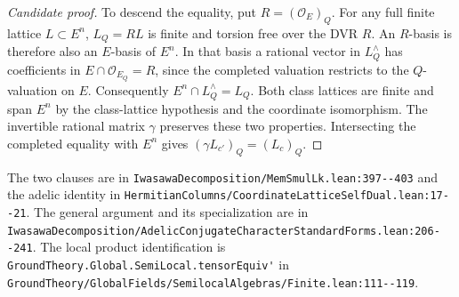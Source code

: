 \begin{proof}[Candidate proof]
To descend the equality, put $R=(\mathcal O_E)_Q$. For any full finite
lattice $L\subset E^n$, $L_Q=R L$ is finite and torsion free over the
DVR $R$. An $R$-basis is therefore also an $E$-basis of $E^n$.
In that basis a rational vector in $L_Q^\wedge$ has coefficients in
$E\cap \mathcal O_{E_Q}=R$, since the completed valuation restricts to
the $Q$-valuation on $E$. Consequently $E^n\cap L_Q^\wedge=L_Q$.
Both class lattices are finite and span $E^n$ by the class-lattice
hypothesis and the coordinate isomorphism. The invertible rational
matrix $\gamma$ preserves these two properties. Intersecting the
completed equality with $E^n$ gives $(\gamma L_{c'})_Q=(L_c)_Q$.
\end{proof}

\noindent\small The two clauses are in
\nolinkurl{IwasawaDecomposition/MemSmulLk.lean:397--403} and the adelic
identity in \nolinkurl{HermitianColumns/CoordinateLatticeSelfDual.lean:17--21}.
The general argument and its specialization  are in
\nolinkurl{IwasawaDecomposition/AdelicConjugateCharacterStandardForms.lean:206--241}.
The local product identification is \nolinkurl{GroundTheory.Global.SemiLocal.tensorEquiv'}
in \nolinkurl{GroundTheory/GlobalFields/SemilocalAlgebras/Finite.lean:111--119}.
\normalsize
